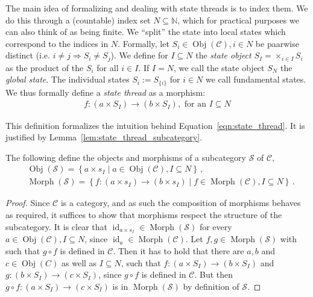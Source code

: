 The main idea of formalizing and dealing with state threads is to index them.
We do this through a (countable) index set $N \subseteq \mathbb{N}$, which for practical purposes we can also think of as being finite.
We ``split'' the state into local states which correspond to the indices in $N$. Formally, let $S_i \in \operatorname{Obj}(\mathcal{C}), i \in N$ be paarwise distinct (i.e. $i \neq j \Rightarrow S_i \neq S_j$).
We define for $I \subseteq N$ the \emph{state object} $S_I = \times_{i \in I} S_i$ as the product of the $S_i$ for all $i \in I$. If $I = N$, we call the state object $S_N$ the \emph{global state}.
The individual states $S_i := S_{\{i\}}$ for $i \in N$ we call fundamental states. We thus formally define a \emph{state thread} as a morphism:
\begin{align*}
  f : (a \times S_I) \rightarrow (b \times S_I), \text{ for an } I \subseteq N
\end{align*}

This definition formalizes the intuition behind Equation~\ref{eqn:state_thread}. 
It is justified by Lemma~\ref{lem:state_thread_subcategory}.

\begin{lem}
\label{lem:state_thread_subcategory}
The following define the objects and morphisms of a subcategory $\mathcal{S}$ of $\mathcal{C}$,
\begin{align}
	& \operatorname{Obj}({\mathcal{S}}) = \left\{ a\times s_I \mid
		a\in\operatorname{Obj}({\mathcal{C}}),
	 	I\subseteq N \right\} \,, \\
	& \operatorname{Morph}({\mathcal{S}}) = \left\{ f : (a\times s_I) \rightarrow (b\times s_I) \mid
		f\in\operatorname{Morph}({\mathcal{C}}),
		I\subseteq N \right\} \,.
\end{align}%
\begin{proof}
Since $\mathcal{C}$ is a category, and as such the composition of morphisms behaves as required, it suffices to show that morphisms respect the structure of the subcategory.
It is clear that $\operatorname{id}_{a\times s_I} \in \operatorname{Morph}(\mathcal{S})$ for every $a \in \operatorname{Obj}(\mathcal{C}), I \subseteq N$, since $\operatorname{id}_a \in \operatorname{Morph}(\mathcal{C})$.
Let $f,g \in \operatorname{Morph}(\mathcal{S})$ with such that $g \circ f$ is defined in $\mathcal{C}$.
Then it has to hold that there are $a,b$ and $c \in \operatorname{Obj}(C)$ as well as $I \subseteq N$, such that $f : (a \times S_I) \rightarrow (b \times S_I)$ and $g : (b \times S_I) \rightarrow (c \times S_I)$,
since $g \circ f$ is defined in $\mathcal{C}$. But then $g \circ f : (a \times S_I) \rightarrow (c \times S_I)$ is in $\operatorname{Morph}(\mathcal{S})$ by definition of $\mathcal{S}$.
\end{proof}
\end{lem}%

